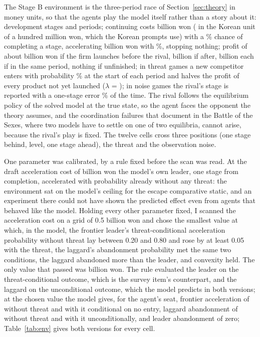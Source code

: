 \documentclass[preprint,12pt,authoryear]{elsarticle}
\begin{document}
The Stage B environment is the three-period race of Section~\ref{sec:theory} in money units, so that the agents play the model itself rather than a story about it: \EnvStages{} development stages and \EnvPeriods{} periods; continuing costs \EnvContinueCostBn{} billion won (\EnvContinueCost{} in the Korean unit of a hundred million won, which the Korean prompts use) with a \EnvContinueSucc\% chance of completing a stage, accelerating \EnvAccelCostBn{} billion won with \EnvAccelSucc\%, stopping nothing; profit of about \EnvPrizeFirstBn{} billion won if the firm launches before the rival, \EnvPrizeSecondBn{} billion if after, \EnvPrizeTieBn{} billion each if in the same period, nothing if unfinished; in threat games a new competitor enters with probability \EnvTheta\% at the start of each period and halves the profit of every product not yet launched ($\lambda$ = \EnvLambda); in noise games the rival's stage is reported with a one-stage error \EnvNoise\% of the time. The rival follows the equilibrium policy of the solved model at the true state, so the agent faces the opponent the theory assumes, and the coordination failures that \citet{akata2025playing} document in the Battle of the Sexes, where two models have to settle on one of two equilibria, cannot arise, because the rival's play is fixed. The twelve cells cross three positions (one stage behind, level, one stage ahead), the threat and the observation noise.

One parameter was calibrated, by a rule fixed before the scan was read. At the draft acceleration cost of \EnvDraftAccelCostBn{} billion won the model's own leader, one stage from completion, accelerated with probability \EnvDraftLeaderAccelNoThreat{} already without any threat: the environment sat on the model's ceiling for the escape comparative static, and an experiment there could not have shown the predicted effect even from agents that behaved like the model. Holding every other parameter fixed, I scanned the acceleration cost on a grid of 0.5 billion won and chose the smallest value at which, in the model, the frontier leader's threat-conditional acceleration probability without threat lay between 0.20 and 0.80 and rose by at least 0.05 with the threat, the laggard's abandonment probability met the same two conditions, the laggard abandoned more than the leader, and convexity held. The only value that passed was \EnvAccelCostBn{} billion won. The rule evaluated the leader on the threat-conditional outcome, which is the survey item's counterpart, and the laggard on the unconditional outcome, which the model predicts in both versions; at the chosen value the model gives, for the agent's seat, frontier acceleration of \EnvLeaderAccelNoThreat{} without threat and \EnvLeaderAccelThreat{} with it conditional on no entry, laggard abandonment of \EnvLaggardQuitNoThreat{} without threat and \EnvLaggardQuitThreat{} with it unconditionally, and leader abandonment of zero; Table~\ref{tab:env} gives both versions for every cell.
\end{document}
